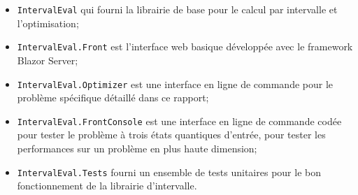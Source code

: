 \begin{itemize}
  \item \texttt{IntervalEval} qui fourni la librairie de base pour le calcul par intervalle et l'optimisation;
  \item \texttt{IntervalEval.Front} est l'interface web basique développée avec le framework Blazor Server;
  \item \texttt{IntervalEval.Optimizer} est une interface en ligne de commande pour le problème spécifique détaillé dans ce rapport;
  \item \texttt{IntervalEval.FrontConsole} est une interface en ligne de commande codée pour tester le problème à trois états quantiques d'entrée, pour tester les performances sur un problème en plus haute dimension;
  \item \texttt{IntervalEval.Tests} fourni un ensemble de tests unitaires pour le bon fonctionnement de la librairie d'intervalle.
\end{itemize}
